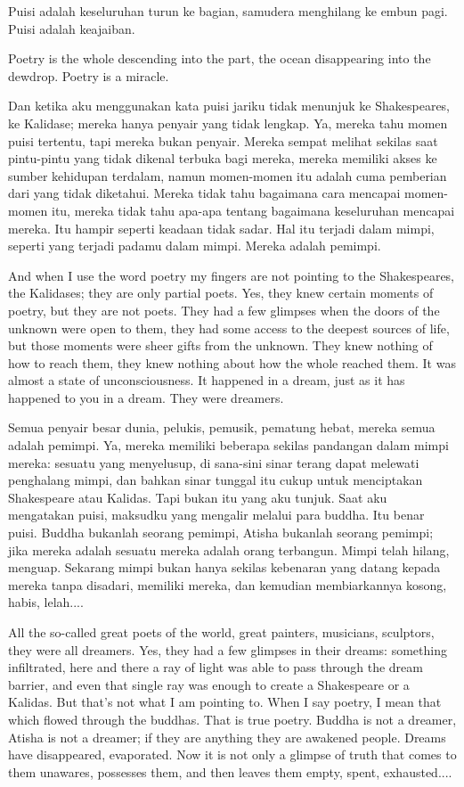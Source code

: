 \bahasa
Puisi adalah keseluruhan turun ke bagian, samudera menghilang ke embun pagi. Puisi adalah keajaiban.

\english
Poetry is the whole descending into the part, the ocean disappearing into the dewdrop. Poetry is a miracle.

\bahasa
Dan ketika aku menggunakan kata puisi jariku tidak menunjuk ke Shakespeares, ke Kalidase; mereka hanya penyair yang tidak lengkap. Ya, mereka tahu momen puisi tertentu, tapi mereka bukan penyair. Mereka sempat melihat sekilas saat pintu-pintu yang tidak dikenal terbuka bagi mereka, mereka memiliki akses ke sumber kehidupan terdalam, namun momen-momen itu adalah cuma pemberian dari yang tidak diketahui. Mereka tidak tahu bagaimana cara mencapai momen-momen itu, mereka tidak tahu apa-apa tentang bagaimana keseluruhan mencapai mereka. Itu hampir seperti keadaan tidak sadar. Hal itu terjadi dalam mimpi, seperti yang terjadi padamu dalam mimpi. Mereka adalah pemimpi.

\english
And when I use the word poetry my fingers are not pointing to the Shakespeares, the Kalidases; they are only partial poets. Yes, they knew certain moments of poetry, but they are not poets. They had a few glimpses when the doors of the unknown were open to them, they had some access to the deepest sources of life, but those moments were sheer gifts from the unknown. They knew nothing of how to reach them, they knew nothing about how the whole reached them. It was almost a state of unconsciousness. It happened in a dream, just as it has happened to you in a dream. They were dreamers.

\bahasa
Semua penyair besar dunia, pelukis, pemusik, pematung hebat, mereka semua adalah pemimpi. Ya, mereka memiliki beberapa sekilas pandangan dalam mimpi mereka: sesuatu yang menyelusup, di sana-sini sinar terang dapat melewati penghalang mimpi, dan bahkan sinar tunggal itu cukup untuk menciptakan Shakespeare atau Kalidas. Tapi bukan itu yang aku tunjuk. Saat aku mengatakan puisi, maksudku yang mengalir melalui para buddha. Itu benar puisi. Buddha bukanlah seorang pemimpi, Atisha bukanlah seorang pemimpi; jika mereka adalah sesuatu mereka adalah orang terbangun. Mimpi telah hilang, menguap. Sekarang mimpi bukan hanya sekilas kebenaran yang datang kepada mereka tanpa disadari, memiliki mereka, dan kemudian membiarkannya kosong, habis, lelah....

\english
All the so-called great poets of the world, great painters, musicians, sculptors, they were all dreamers. Yes, they had a few glimpses in their dreams: something infiltrated, here and there a ray of light was able to pass through the dream barrier, and even that single ray was enough to create a Shakespeare or a Kalidas. But that's not what I am pointing to. When I say poetry, I mean that which flowed through the buddhas. That is true poetry. Buddha is not a dreamer, Atisha is not a dreamer; if they are anything they are awakened people. Dreams have disappeared, evaporated. Now it is not only a glimpse of truth that comes to them unawares, possesses them, and then leaves them empty, spent, exhausted....

